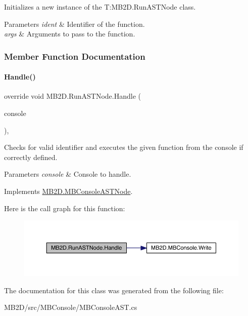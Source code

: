 Initializes a new instance of the T\+:\+M\+B2\+D.\+Run\+A\+S\+T\+Node class. 


\begin{DoxyParams}{Parameters}
{\em ident} & Identifier of the function.\\
\hline
{\em args} & Arguments to pass to the function.\\
\hline
\end{DoxyParams}


\subsubsection{Member Function Documentation}
\hypertarget{class_m_b2_d_1_1_run_a_s_t_node_a20845d86608c81357f4347c29dcaf2c8}{}\label{class_m_b2_d_1_1_run_a_s_t_node_a20845d86608c81357f4347c29dcaf2c8} 
\paragraph{\texorpdfstring{Handle()}{Handle()}}
{\footnotesize\ttfamily override void M\+B2\+D.\+Run\+A\+S\+T\+Node.\+Handle (\begin{DoxyParamCaption}\item[{\hyperlink{class_m_b2_d_1_1_m_b_console}{M\+B\+Console}}]{console }\end{DoxyParamCaption})\hspace{0.3cm}{\ttfamily [inline]}, {\ttfamily [virtual]}}



Checks for valid identifier and executes the given function from the console if correctly defined. 


\begin{DoxyParams}{Parameters}
{\em console} & Console to handle.\\
\hline
\end{DoxyParams}


Implements \hyperlink{class_m_b2_d_1_1_m_b_console_a_s_t_node_aa70a49e61ab623698af4ed8fda4ebbf5}{M\+B2\+D.\+M\+B\+Console\+A\+S\+T\+Node}.

Here is the call graph for this function\+:
\nopagebreak
\begin{figure}[H]
\begin{center}
\leavevmode
\includegraphics[width=350pt]{class_m_b2_d_1_1_run_a_s_t_node_a20845d86608c81357f4347c29dcaf2c8_cgraph}
\end{center}
\end{figure}


The documentation for this class was generated from the following file\+:\begin{DoxyCompactItemize}
\item 
M\+B2\+D/src/\+M\+B\+Console/M\+B\+Console\+A\+S\+T.\+cs\end{DoxyCompactItemize}
